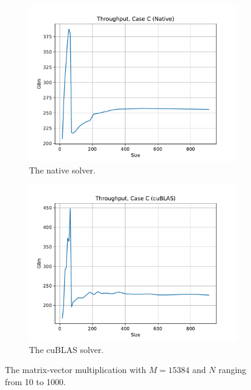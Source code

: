 \documentclass[9pt]{article}
\begin{document}
\begin{figure}[!ht]
    \centering
    \begin{subfigure}[b]{0.49\textwidth}
        \centering
        \includegraphics[width=\linewidth]{figs/case_c_native.pdf}
        \caption{The native solver.}
        \label{fig:case_c_native}
    \end{subfigure}\hfill
    \begin{subfigure}[b]{0.49\textwidth}
        \centering
        \includegraphics[width=\linewidth]{figs/case_c_cublas.pdf}
	\caption{The cuBLAS solver.}
	\label{fig:case_c_cublas}
    \end{subfigure}\hfill
    \caption{The matrix-vector multiplication with $M=15384$ and $N$ ranging from 10 to 1000.}
    \label{fig:case_c_mv_mult}
\end{figure}
\end{document}
